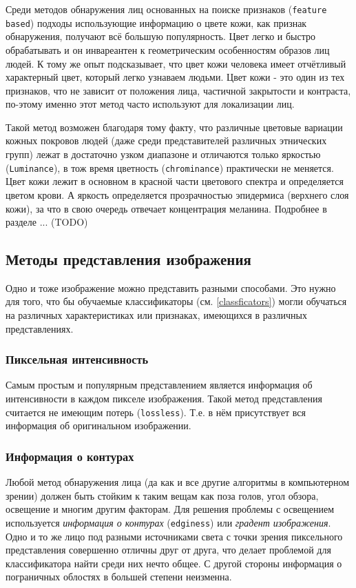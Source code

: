 \documentclass[12pt]{report}
\begin{document}
Среди методов обнаружения лиц основанных на поиске признаков (\texttt{feature based}) подходы использующие информацию о цвете кожи, как признак обнаружения, получают всё большую популярность. Цвет легко и быстро обрабатывать и он инвареантен к геометрическим особенностям образов лиц людей. К тому же опыт подсказывает, что цвет кожи человека имеет отчётливый характерный цвет, который легко узнаваем людьми. \citep{vezhnevets2003survey} Цвет кожи - это один из тех признаков, что не зависит от положения лица, частичной закрытости и контраста, по-этому именно этот метод часто используют для локализации лиц. \citep{ruangyam2009efficient}

Такой метод возможен благодаря тому факту, что различные цветовые вариации кожных покровов людей (даже среди представителей различных этнических групп) лежат в достаточно узком диапазоне и отличаются только яркостью (\texttt{Luminance}), в тож время цветность (\texttt{chrominance}) практически не меняется. Цвет кожи лежит в основном в красной части цветового спектра и определяется цветом крови. А яркость определяется прозрачностью эпидермиса (верхнего слоя кожи), за что в свою очередь отвечает концентрация меланина. \citep{xu2006color} Подробнее в разделе ... (TODO)

\subsection{Методы представления изображения}
Одно и тоже изображение можно представить разными способами. Это нужно для того, что бы обучаемые классификаторы (см. \ref{classficators}) могли обучаться на различных характеристиках или признаках, имеющихся в различных представлениях. 



\subsubsection{Пиксельная интенсивность}
Самым простым и популярным представлением является информация об интенсивности в каждом пикселе изображения. Такой метод представления считается не имеющим потерь (\texttt{lossless}). Т.е. в нём присутствует  вся информация об оригинальном изображении.\citep{bojkovic2006face}
\subsubsection{Информация о контурах}
Любой метод обнаружения лица (да как и все другие алгоритмы в компьютерном зрении) должен быть стойким к таким вещам как поза голов, угол обзора, освещение и многим другим факторам. 
Для решения проблемы с освещением используется \emph{информация о контурах} (\texttt{edginess}) или \emph{градент изображения}. Одно и то же лицо под разными источниками света с точки зрения пиксельного представления совершенно отличны друг от друга, что делает проблемой для классификатора найти среди них нечто общее. С другой стороны информация о пограничных облостях в большей степени неизменна. \citep{ahmadyfard2008hierarchical}
\end{document}
